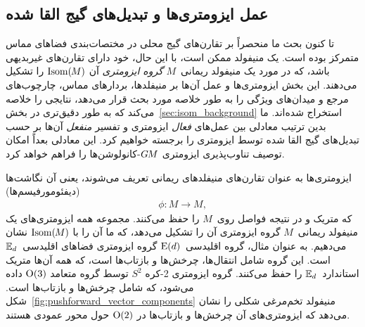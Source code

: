 

\subsection{عمل ایزومتری‌ها و تبدیل‌های گیج القا شده}
\label{sec:isometries_local}


تا کنون بحث ما منحصراً بر تقارن‌های گیج محلی در مختصات‌بندی فضاهای مماس متمرکز بوده است.
یک منیفولد ممکن است، با این حال، خود دارای تقارن‌های غیربدیهی باشد، که در مورد یک منیفولد ریمانی~$M$ \emph{گروه ایزومتری} آن $\operatorname{Isom}(\mkern-1.5mu M \mkern-.5mu)$ را تشکیل می‌دهند.
این بخش ایزومتری‌ها و عمل آن‌ها بر منیفلدها، بردارهای مماس، چارچوب‌های مرجع و میدان‌های ویژگی را به طور خلاصه مورد بحث قرار می‌دهد، نتایجی را خلاصه می‌کند که به طور دقیق‌تری در بخش~\ref{sec:isom_background} استخراج شده‌اند.
ما بدین ترتیب معادلی بین عمل‌های \emph{فعال} ایزومتری و تفسیر \emph{منفعل} آن‌ها بر حسب تبدیل‌های گیج القا شده توسط ایزومتری را برجسته خواهیم کرد.
این معادلی بعداً امکان توصیف تناوب‌پذیری ایزومتری $G\mkern-1.4muM$-کانولوشن‌ها را فراهم خواهد کرد.


ایزومتری‌ها به عنوان تقارن‌های منیفلدهای ریمانی تعریف می‌شوند، یعنی آن نگاشت‌ها (دیفئومورفیسم‌ها)
\begin{align}
	\phi: M \to M,
\end{align}
که متریک و در نتیجه فواصل روی~$M$ را حفظ می‌کنند.
مجموعه همه ایزومتری‌های یک منیفولد ریمانی~$M$ گروه ایزومتری آن را تشکیل می‌دهد، که ما آن را با $\operatorname{Isom}(\mkern-1.5mu M \mkern-.5mu)$ نشان می‌دهیم.
به عنوان مثال، گروه اقلیدسی~$\operatorname{E}(d)$ گروه ایزومتری فضاهای اقلیدسی~$\mathbb{E}_d$ است.
این گروه شامل انتقال‌ها، چرخش‌ها و بازتاب‌ها است، که همه آن‌ها متریک استاندارد~$\mathbb{E}_d$ را حفظ می‌کنند.
گروه ایزومتری 2-کره $S^2$ توسط گروه متعامد $\operatorname{O}(3)$ داده می‌شود، که شامل چرخش‌ها و بازتاب‌ها است.
شکل~\ref{fig:pushforward_vector_components} منیفولد تخم‌مرغی شکلی را نشان می‌دهد که ایزومتری‌های آن چرخش‌ها و بازتاب‌ها در $\operatorname{O}(2)$ حول محور عمودی هستند.


